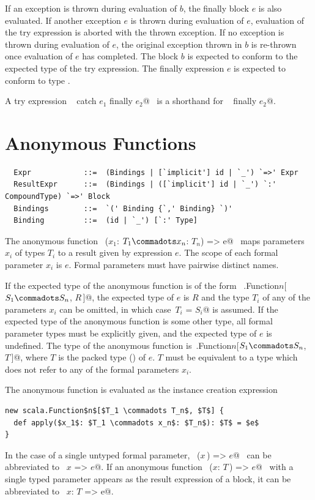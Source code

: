 If an exception is thrown during evaluation of $b$, the finally block
$e$ is also evaluated. If another exception $e$ is thrown
during evaluation of $e$, evaluation of the try expression is
aborted with the thrown exception. If no exception is thrown during
evaluation of $e$, the original exception thrown in $b$ is
re-thrown once evaluation of $e$ has completed.  The block
$b$ is expected to conform to the expected type of the try
expression. The finally expression $e$ is expected to conform to
type .

A try expression ~ catch $e_1$ finally $e_2$@~ 
is a shorthand
for  ~ finally $e_2$@.

\section{Anonymous Functions}
\label{sec:closures}

\syntax\begin{lstlisting}
  Expr            ::=  (Bindings | [`implicit'] id | `_') `=>' Expr
  ResultExpr      ::=  (Bindings | ([`implicit'] id | `_') `:' CompoundType) `=>' Block
  Bindings        ::=  `(' Binding {`,' Binding} `)'
  Binding         ::=  (id | `_') [`:' Type]
\end{lstlisting}

The anonymous function ~\lstinline@($x_1$: $T_1 \commadots x_n$: $T_n$) => e@~ 
maps parameters $x_i$ of types $T_i$ to a result given
by expression $e$. The scope of each formal parameter
$x_i$ is $e$. Formal parameters must have pairwise distinct names.

If the expected type of the anonymous function is of the form
~\lstinline@scala.Function$n$[$S_1 \commadots S_n$, $R\,$]@, the
expected type of $e$ is $R$ and the type $T_i$ of any of the
parameters $x_i$ can be omitted, in which
case~\lstinline@$T_i$ = $S_i$@ is assumed.
If the expected type of the anonymous function is
some other type, all formal parameter types must be explicitly given,
and the expected type of $e$ is undefined. The type of the anonymous
function
is~\lstinline@scala.Function$n$[$S_1 \commadots S_n$, $T\,$]@,
where $T$ is the packed type () 
of $e$. $T$ must be equivalent to a
type which does not refer to any of the formal parameters $x_i$.

The anonymous function is evaluated as the instance creation expression
\begin{lstlisting}
new scala.Function$n$[$T_1 \commadots T_n$, $T$] {
  def apply($x_1$: $T_1 \commadots x_n$: $T_n$): $T$ = $e$
}
\end{lstlisting}
In the case of a single untyped formal parameter, 
~\lstinline@($x\,$) => $e$@~ 
can be abbreviated to ~\lstinline@$x$ => $e$@. If an
anonymous function ~\lstinline@($x$: $T\,$) => $e$@~ with a single
typed parameter appears as the result expression of a block, it can be
abbreviated to ~\lstinline@$x$: $T$ => e@.


